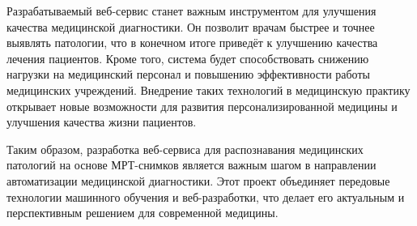 {\par \redline Разрабатываемый веб-сервис станет важным инструментом для улучшения качества медицинской диагностики. Он позволит врачам быстрее и точнее выявлять патологии, что в конечном итоге приведёт к улучшению качества лечения пациентов. Кроме того, система будет способствовать снижению нагрузки на медицинский персонал и повышению эффективности работы медицинских учреждений. Внедрение таких технологий в медицинскую практику открывает новые возможности для развития персонализированной медицины и улучшения качества жизни пациентов.

\par \redline Таким образом, разработка веб-сервиса для распознавания медицинских патологий на основе МРТ-снимков является важным шагом в направлении автоматизации медицинской диагностики. Этот проект объединяет передовые технологии машинного обучения и веб-разработки, что делает его актуальным и перспективным решением для современной медицины.

\par

}
